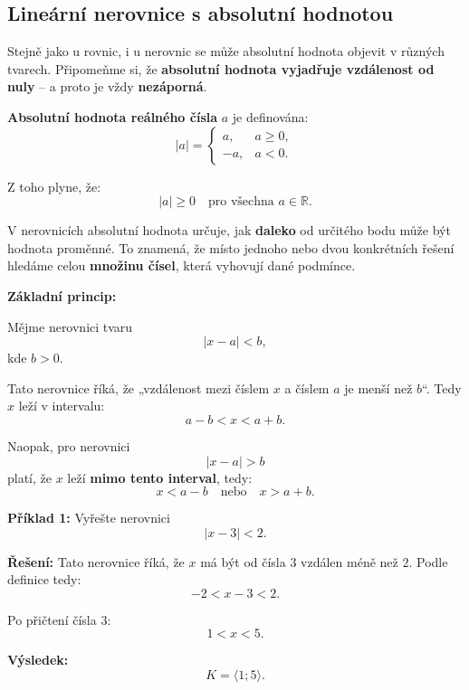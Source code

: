 \documentclass[12pt,a4paper]{article}
\begin{document}
\subsection{Lineární nerovnice s absolutní hodnotou}

Stejně jako u rovnic, i u nerovnic se může absolutní hodnota objevit v různých tvarech.  
Připomeňme si, že \textbf{absolutní hodnota vyjadřuje vzdálenost od nuly} –  
a proto je vždy \textbf{nezáporná}.  

\begin{definitionbox}
\textbf{Absolutní hodnota reálného čísla} \(a\) je definována:
\[
|a| =
\begin{cases}
a, & a \ge 0,\\[4pt]
-a, & a < 0.
\end{cases}
\]

Z toho plyne, že:
\[
|a| \ge 0 \quad \text{pro všechna } a \in \mathbb{R}.
\]
\end{definitionbox}

V nerovnicích absolutní hodnota určuje, jak \textbf{daleko} od určitého bodu může být hodnota proměnné.  
To znamená, že místo jednoho nebo dvou konkrétních řešení hledáme celou \textbf{množinu čísel}, která vyhovují dané podmínce.


\begin{notebox}
\textbf{Základní princip:}

Mějme nerovnici tvaru
\[
|x - a| < b,
\]
kde \(b > 0\).

\medskip
Tato nerovnice říká, že „vzdálenost mezi číslem \(x\) a číslem \(a\) je menší než \(b\)“.  
Tedy \(x\) leží v intervalu:
\[
a - b < x < a + b.
\]

Naopak, pro nerovnici
\[
|x - a| > b
\]
platí, že \(x\) leží \textbf{mimo tento interval}, tedy:
\[
x < a - b \quad \text{nebo} \quad x > a + b.
\]
\end{notebox}


\begin{examplebox}
\textbf{Příklad 1:}  
Vyřešte nerovnici
\[
|x - 3| < 2.
\]

\textbf{Řešení:}  
Tato nerovnice říká, že \(x\) má být od čísla \(3\) vzdálen méně než \(2\).  
Podle definice tedy:
\[
-2 < x - 3 < 2.
\]

Po přičtení čísla \(3\):
\[
1 < x < 5.
\]

\textbf{Výsledek:}
\[
K = \langle 1; 5 \rangle.
\]

\begin{center}
\end{center}
\end{examplebox}
\end{document}
